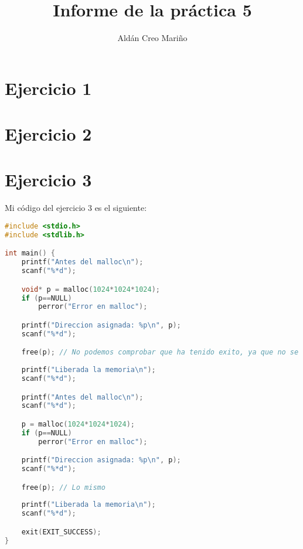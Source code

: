\documentclass[a4paper]{article}
\title{Informe de la práctica 5}
\author{Aldán Creo Mariño}
\begin{document}
\maketitle
\newpage
    
\tableofcontents
\newpage

\section{Ejercicio 1}



\section{Ejercicio 2}



\section{Ejercicio 3}

Mi código del ejercicio 3 es el siguiente:

\begin{lstlisting}[language=C]
#include <stdio.h>
#include <stdlib.h>

int main() {
    printf("Antes del malloc\n");
    scanf("%*d");

    void* p = malloc(1024*1024*1024);
    if (p==NULL)
        perror("Error en malloc");

    printf("Direccion asignada: %p\n", p);
    scanf("%*d");

    free(p); // No podemos comprobar que ha tenido exito, ya que no se devuelve nada
    
    printf("Liberada la memoria\n");
    scanf("%*d");

    printf("Antes del malloc\n");
    scanf("%*d");

    p = malloc(1024*1024*1024);
    if (p==NULL)
        perror("Error en malloc");

    printf("Direccion asignada: %p\n", p);
    scanf("%*d");

    free(p); // Lo mismo
    
    printf("Liberada la memoria\n");
    scanf("%*d");

    exit(EXIT_SUCCESS);
}
\end{lstlisting}
\end{document}
